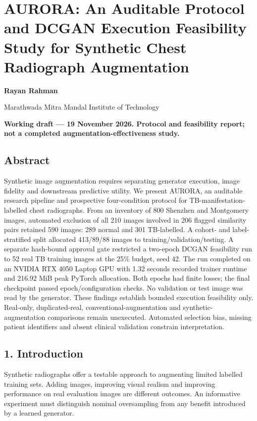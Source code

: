 \documentclass[
]{article}
\author{}
\date{}
\begin{document}
\section{AURORA: An Auditable Protocol and DCGAN Execution Feasibility
Study for Synthetic Chest Radiograph
Augmentation}\label{aurora-an-auditable-protocol-and-dcgan-execution-feasibility-study-for-synthetic-chest-radiograph-augmentation}

\textbf{Rayan Rahman}

Marathwada Mitra Mandal Institute of Technology

\textbf{Working draft --- 19 November 2026. Protocol and feasibility
report; not a completed augmentation-effectiveness study.}

\subsection{Abstract}\label{abstract}

Synthetic image augmentation requires separating generator execution,
image fidelity and downstream predictive utility. We present AURORA, an
auditable research pipeline and prospective four-condition protocol for
TB-manifestation-labelled chest radiographs. From an inventory of 800
Shenzhen and Montgomery images, automated exclusion of all 210 images
involved in 206 flagged similarity pairs retained 590 images: 289 normal
and 301 TB-labelled. A cohort- and label-stratified split allocated
413/89/88 images to training/validation/testing. A separate hash-bound
approval gate restricted a two-epoch DCGAN feasibility run to 52 real TB
training images at the 25\% budget, seed 42. The run completed on an
NVIDIA RTX 4050 Laptop GPU with 1.32 seconds recorded trainer runtime
and 216.92 MiB peak PyTorch allocation. Both epochs had finite losses;
the final checkpoint passed epoch/configuration checks. No validation or
test image was read by the generator. These findings establish bounded
execution feasibility only. Real-only, duplicated-real,
conventional-augmentation and synthetic-augmentation comparisons remain
unexecuted. Automated selection bias, missing patient identifiers and
absent clinical validation constrain interpretation.

\subsection{1. Introduction}\label{introduction}

Synthetic radiographs offer a testable approach to augmenting limited
labelled training sets. Adding images, improving visual realism and
improving performance on real evaluation images are different outcomes.
An informative experiment must distinguish nominal oversampling from any
benefit introduced by a learned generator.
\end{document}
